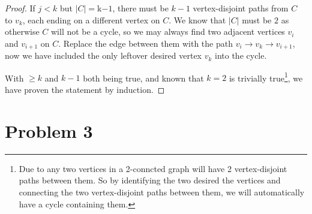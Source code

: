 \documentclass[11pt]{article}
\begin{document}
\begin{proof}
If $j < k$ but $|C| = $k$-1$, there must be $k-1$ vertex-disjoint paths from $C$ to $v_k$, each ending on a different vertex on $C$. We know that $|C|$ must be $2$ as otherwise $C$ will not be a cycle, so we may always find two adjacent vertices $v_i$ and $v_{i+1}$ on $C$. Replace the edge between them with the path $v_{i} \to v_k \to v_{i+1}$, now we have included the only leftover desired vertex $v_k$ into the cycle.\newline

With $\geq k$ and $k-1$ both being true, and known that $k=2$ is trivially true\footnote{Due to any two vertices in a 2-conncted graph will have 2 vertex-disjoint paths between them. So by identifying the two desired the vertices and connecting the two vertex-disjoint paths between them, we will automatically have a cycle containing them.}, we have proven the statement by induction.





\end{proof}

\section*{Problem 3}


%
% 
% 
\end{document}
